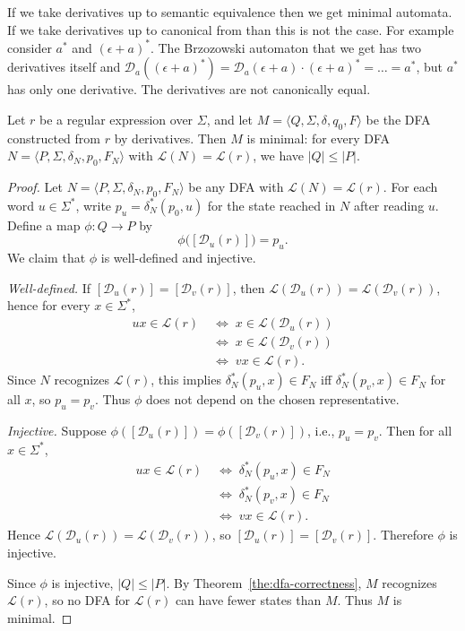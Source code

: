 {\color{red} If we take derivatives up to semantic equivalence then we get minimal automata. If we take derivatives up to canonical from than this is not the case. For example consider $a^\ast$ and $(\epsilon+a)^\ast$. The Brzozowski automaton that we get has two derivatives itself and $\mathcal D_a((\epsilon+a)^\ast) =\mathcal D_a(\epsilon+a)\cdot(\epsilon+a)^\ast=\ldots =a^\ast$, but $a^\ast$ has only one derivative. The derivatives are not canonically equal.}

\begin{theorem}\label{the:dfa-minimality}
Let $r$ be a regular expression over $\Sigma$, and let
$M = \langle Q, \Sigma, \delta, q_0, F \rangle$
be the DFA constructed from $r$ by derivatives.
Then $M$ is minimal: for every DFA
$N = \langle P, \Sigma, \delta_N, p_0, F_N \rangle$
with $\mathcal{L}(N) = \mathcal{L}(r)$, we have $|Q| \le |P|$.
\end{theorem}

\begin{proof}
Let $N=\langle P, \Sigma, \delta_N, p_0, F_N \rangle$ be any DFA with
$\mathcal{L}(N)=\mathcal{L}(r)$. For each word $u\in\Sigma^*$, write
$p_u = \delta_N^*(p_0,u)$ for the state reached in $N$ after reading $u$.
Define a map $\phi : Q \to P$ by
\[
  \phi\bigl([\mathcal{D}_u(r)]\bigr) = p_u.
\]
We claim that $\phi$ is well-defined and injective.

\smallskip
\noindent\emph{Well-defined.}
If $[\mathcal{D}_u(r)]=[\mathcal{D}_v(r)]$, then
$\mathcal{L}(\mathcal{D}_u(r))=\mathcal{L}(\mathcal{D}_v(r))$, hence for every
$x\in\Sigma^*$,
\[
  \begin{aligned}
    ux \in \mathcal{L}(r) \;&\Longleftrightarrow\; x \in \mathcal{L}(\mathcal{D}_u(r)) \\
    \;&\Longleftrightarrow\; x \in \mathcal{L}(\mathcal{D}_v(r)) \\
    \;&\Longleftrightarrow\; vx \in \mathcal{L}(r).
  \end{aligned}
\]
Since $N$ recognizes $\mathcal{L}(r)$, this implies
$\delta_N^*(p_u,x)\in F_N$ iff $\delta_N^*(p_v,x)\in F_N$ for all $x$,
so $p_u=p_v$. Thus $\phi$ does not depend on the chosen representative.

\smallskip
\noindent\emph{Injective.}
Suppose $\phi([\mathcal{D}_u(r)])=\phi([\mathcal{D}_v(r)])$, i.e., $p_u=p_v$.
Then for all $x\in\Sigma^*$,
\[
  \begin{aligned}
    ux \in \mathcal{L}(r)
    \;&\Longleftrightarrow\;
    \delta_N^*(p_u,x)\in F_N \\
    \;&\Longleftrightarrow\;
    \delta_N^*(p_v,x)\in F_N \\
    \;&\Longleftrightarrow\;
    vx \in \mathcal{L}(r).
  \end{aligned}
\]
Hence $\mathcal{L}(\mathcal{D}_u(r))=\mathcal{L}(\mathcal{D}_v(r))$, so
$[\mathcal{D}_u(r)]=[\mathcal{D}_v(r)]$. Therefore $\phi$ is injective.

\smallskip
Since $\phi$ is injective, $|Q| \le |P|$. By Theorem~\ref{the:dfa-correctness},
$M$ recognizes $\mathcal{L}(r)$, so no DFA for $\mathcal{L}(r)$ can have fewer
states than $M$. Thus $M$ is minimal.
\end{proof}

